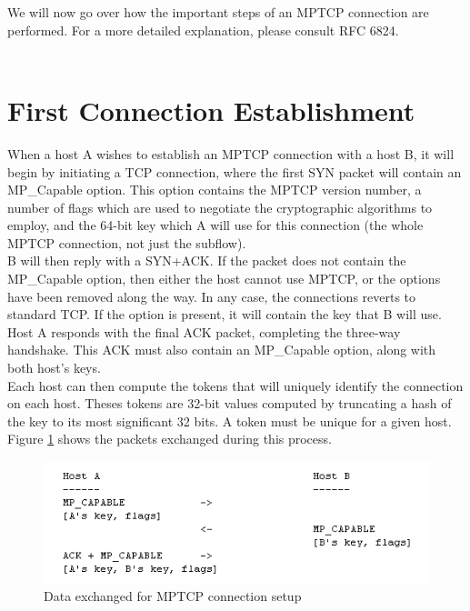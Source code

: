 We will now go over how the important steps of an MPTCP connection are performed. For a more detailed explanation, please consult RFC 6824.\\ \\



\section{First Connection Establishment}
When a host A wishes to establish an MPTCP connection with a host B, it will begin by initiating a TCP connection, where the first SYN packet will contain an MP\_Capable option. This option contains the MPTCP version number, a number of flags which are used to negotiate the cryptographic algorithms to employ, and the 64-bit key which A will use for this connection (the whole MPTCP connection, not just the subflow). \\

B will then reply with a SYN+ACK. If the packet does not contain the MP\_Capable option, then either the host cannot use MPTCP, or the options have been removed along the way. In any case, the connections reverts to standard TCP. If the option is present, it will contain the key that B will use. Host A responds with the final ACK packet, completing the three-way handshake. This ACK must also contain an MP\_Capable option, along with both host's keys. \\

Each host can then compute the tokens that will uniquely identify the connection on each host. Theses tokens are 32-bit values computed by truncating a hash of the key to its most significant 32 bits. A token must be unique for a given host. Figure  \ref{pic:mpcapex} shows the packets exchanged during this process.

\begin{figure}[!t]
\centering
\includegraphics[scale= 0.6]{Figures/mpcapex.png}
\caption{Data exchanged for MPTCP connection setup}
\label{pic:mpcapex}
\end{figure}

